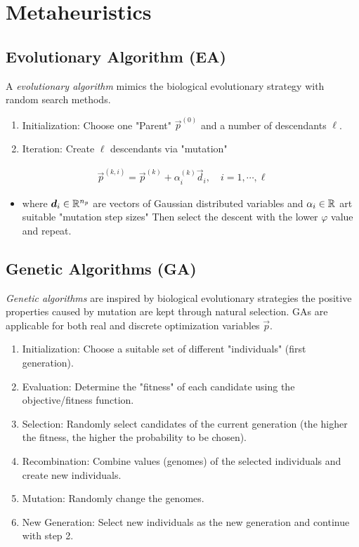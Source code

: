 	\section{Metaheuristics}
		\subsection{Evolutionary Algorithm (EA)}
			A \emph{evolutionary algorithm} mimics the biological evolutionary strategy with random search methods.

			\begin{enumerate}
				\item Initialization: \tabto{2.5cm} Choose one "Parent" \( \vec{p}^{(0)} \) and a number of descendants \(\ell\).
				\item Iteration: \tabto{2.5cm} Create \(\ell\) descendants via "mutation"
			\end{enumerate}
			\begin{align*}
				\vec{p}^{(k, i)} = \vec{p}^{(k)} + \alpha_i^{(k)} \vec{d}_i,\quad i = 1, \cdots, \ell
			\end{align*}
			\begin{itemize}
				\item[] where \( \bm{d}_i \in \mathbb{R}^{n_p} \) are vectors of Gaussian distributed variables and \( \alpha_i \in \mathbb{R} \) art suitable "mutation step sizes" Then select the descent with the lower \( \varphi \) value and repeat.
			\end{itemize}

		\subsection{Genetic Algorithms (GA)}
			\emph{Genetic algorithms} are inspired by biological evolutionary strategies the positive properties caused by mutation are kept through natural selection. GAs are applicable for both real and discrete optimization variables \(\vec{p}\).
			\begin{enumerate}
				\item Initialization: \tabto{3cm} Choose a suitable set of different "individuals" (first generation).
				\item Evaluation: \tabto{3cm} Determine the "fitness" of each candidate using the objective/fitness function.
				\item Selection: \tabto{3cm} Randomly select candidates of the current generation (the higher the fitness, the higher the probability to be chosen).
				\item Recombination: \tabto{3cm} Combine values (genomes) of the selected individuals and create new individuals.
				\item Mutation: \tabto{3cm} Randomly change the genomes.
				\item New Generation: \tabto{3cm} Select new individuals as the new generation and continue with step 2.
			\end{enumerate}

